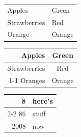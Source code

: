 \documentclass[a4paper,12pt]{article}
\begin{document}
\begin{tabular}{|l|l|}
  Apples       & Green  \\
  Strawberries & Red    \\
  Orange       & Orange \\
\end{tabular}

\bigskip

\begin{tabular}{rc}
  Apples              & Green  \\
  \hline
  Strawberries        & Red    \\
  \cline{1-1} Oranges & Orange \\
\end{tabular}

\bigskip

\begin{tabular}{|r|l|}
  \hline
  8              & here's \\
  \cline{2-2} 86 & stuff  \\
  \hline
  \hline
  2008           & now    \\
  \hline
\end{tabular}
\end{document}
